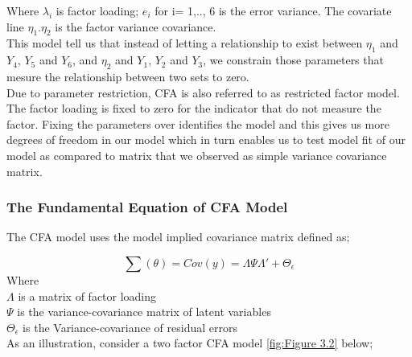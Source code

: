 \documentclass[12pt]{article}
\begin{document}
Where $\lambda_i$ is factor loading; $e_i$ for i= 1,.., 6 is the error variance. The covariate line $\eta_1$.$\eta_2$ is the factor variance covariance.\\
This model tell us that instead of letting a relationship to exist between $\eta_1$ and $Y_4$, $Y_5$ and $Y_6$, and $\eta_2$ and $Y_1$, $Y_2$ and $Y_3$, we constrain those parameters that mesure the relationship between two sets to zero.\\
Due to parameter restriction, CFA is also referred to as restricted factor model. The factor loading is fixed to zero for the indicator that do not measure the factor. Fixing the parameters over identifies the model and this gives us more degrees of freedom in our model which in turn enables us to test model fit of our model as compared to matrix that we observed as simple variance covariance matrix.

\subsubsection{The Fundamental Equation of CFA Model}
The CFA model uses the model implied covariance matrix defined as;

\begin{equation}
	\sum(\theta)= Cov(y)= \Lambda \Psi\Lambda'+\Theta_\epsilon \label{eq:3.1}
\end{equation}
Where\\
$\Lambda$ is a matrix of factor loading\\
$\Psi$ is the variance-covariance matrix of latent variables\\
$\Theta_\epsilon$ is the Variance-covariance of residual errors\\

As an illustration, consider a two factor CFA model \ref{fig:Figure 3.2} below;
\end{document}
